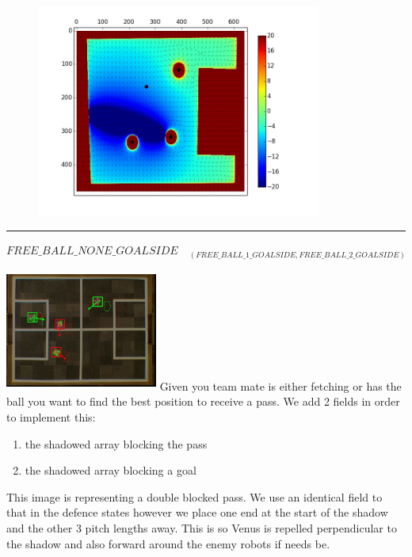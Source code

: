 \documentclass[a4paper,12pt]{article}
\begin{document}
\begin{minipage}{0.5\textwidth}
\includegraphics[height=70mm,width=115mm]{p2.jpg}
\end{minipage}\newline\newline
\rule{\textwidth}{1pt}\newline
$FREE\_BALL\_NONE\_GOALSIDE\quad_{(FREE\_BALL\_1\_GOALSIDE, FREE\_BALL\_2\_GOALSIDE)}$ \newline \newline
\begin{minipage}{0.5\textwidth}
\includegraphics[height=40mm,width=50mm]{v4.jpg}\newline
Given you team mate is either fetching or has the ball you want to find the best position to receive a pass. We add 2 fields in order to implement this: \begin {enumerate}\item the shadowed array blocking the pass \item the shadowed array blocking a goal\end{enumerate} This image is representing a double blocked pass. We use an identical field to that in the defence states however we place one end at the start of the shadow and the other 3 pitch lengths away. This is so Venus is repelled perpendicular to the shadow and also forward around the enemy robots if needs be.
\end{minipage}
\hspace{.2cm}
\end{document}
